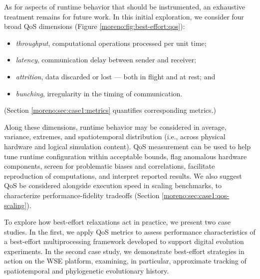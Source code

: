 As for aspects of runtime behavior that should be instrumented, an exhaustive treatment remains for future work.
In this initial exploration, we consider four broad QoS dimensions (Figure \ref{moreno:fig:best-effort:qos}):
\begin{itemize}
  \item \textit{throughput}, computational operations processed per unit time;
  \item \textit{latency}, communication delay between sender and receiver;
  \item \textit{attrition}, data discarded or lost --- both in flight and at rest; and
  \item \textit{bunching}, irregularity in the timing of communication.
\end{itemize}
(Section \ref{moreno:sec:case1:metrics} quantifies corresponding metrics.)

Along these dimensions, runtime behavior may be considered in average, variance, extremes, and spatiotemporal distribution (i.e., across physical hardware and logical simulation content).
QoS measurement can be used to help tune runtime configuration within acceptable bounds, flag anomalous hardware components, screen for problematic biases and correlations, facilitate reproduction of computations, and interpret reported results.
We also suggest QoS be considered alongside execution speed in scaling benchmarks, to characterize performance-fidelity tradeoffs (Section \ref{moreno:sec:case1:qos-scaling}).

To explore how best-effort relaxations act in practice, we present two case studies.
In the first, we apply QoS metrics to assess performance characteristics of a best-effort multiprocessing framework developed to support digital evolution experiments.
In the second case study, we demonstrate best-effort strategies in action on the WSE platform, examining, in particular, approximate tracking of spatiotemporal and phylogenetic evolutionary history.


